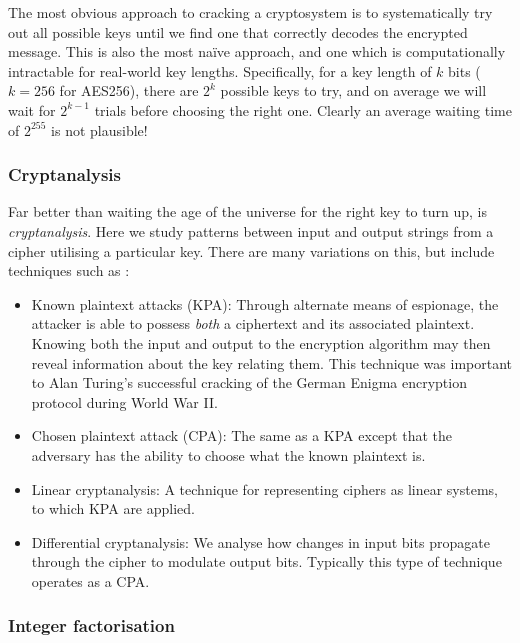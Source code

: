 The most obvious approach to cracking a cryptosystem is to systematically try out all possible keys until we find one that correctly decodes the encrypted message. This is also the most na\"ive approach, and one which is computationally intractable for real-world key lengths. Specifically, for a key length of $k$ bits (\mbox{$k=256$} for AES256), there are $2^k$ possible keys to try, and on average we will wait for $2^{k-1}$ trials before choosing the right one. Clearly an average waiting time of $2^{255}$ is not plausible!

%
%

\subsubsection{Cryptanalysis}

Far better than waiting the age of the universe for the right key to turn up, is \textit{cryptanalysis}. Here we study patterns between input and output strings from a cipher utilising a particular key. There are many variations on this, but include techniques such as \cite{bib:Schneier96}:

\begin{itemize}
	\item Known plaintext attacks (KPA): Through alternate means of espionage, the attacker is able to possess \textit{both} a ciphertext and its associated plaintext. Knowing both the input and output to the encryption algorithm may then reveal information about the key relating them. This technique was important to Alan Turing's successful cracking of the German Enigma encryption protocol during World War II.
	\item Chosen plaintext attack (CPA): The same as a KPA except that the adversary has the ability to choose what the known plaintext is.
	\item Linear cryptanalysis: A technique for representing ciphers as linear systems, to which KPA are applied.
	\item Differential cryptanalysis: We analyse how changes in input bits propagate through the cipher to modulate output bits. Typically this type of technique operates as a CPA.
\end{itemize}
 
%
%
 
\subsubsection{Integer factorisation}

